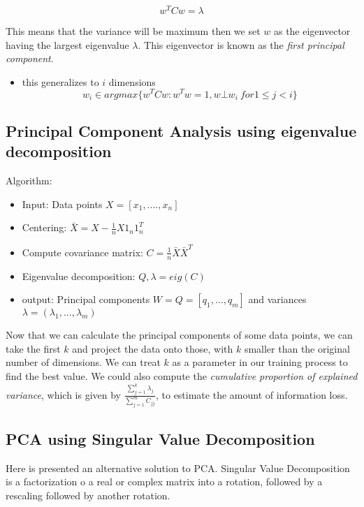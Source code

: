 \documentclass[11pt]{article}
\begin{document}
\[w^TCw=\lambda\]

This means that the variance will be maximum then we set \(w\) as the
eigenvector having the largest eigenvalue \(\lambda\). This eigenvector
is known as the \emph{first principal component}.

\begin{itemize}
\tightlist
\item
  this generalizes to \(i\) dimensions
  \[w_i \in argmax \{ w^T C w: w^T w =1, w \bot w_i\ for 1 \le j < i \}\]
\end{itemize}

\subsection{Principal Component Analysis using eigenvalue
decomposition}\label{principal-component-analysis-using-eigenvalue-decomposition}

Algorithm:

\begin{itemize}
\tightlist
\item
  Input: Data points \(X=[x_1, ...., x_n]\)
\item
  Centering: \(\bar X = X - \frac{1}{n}X1_n1_n^T\)
\item
  Compute covariance matrix: \(C=\frac{1}{n}\bar X \bar X^T\)
\item
  Eigenvalue decomposition: \(Q, \lambda = eig(C)\)
\item
  output: Principal components \(W = Q = [q_1, ..., q_m]\) and variances
  \(\lambda = (\lambda _1, ..., \lambda _m)\)
\end{itemize}

Now that we can calculate the principal components of some data points,
we can take the first \(k\) and project the data onto those, with \(k\)
smaller than the original number of dimensions. We can treat \(k\) as a
parameter in our training process to find the best value. We could also
compute the \emph{cumulative proportion of explained variance}, which is
given by \(\frac{\sum_{j=1}^k \lambda_j}{\sum_{j=1}^m C_{jj}}\), to
estimate the amount of information loss.

\subsection{PCA using Singular Value
Decomposition}\label{pca-using-singular-value-decomposition}

Here is presented an alternative solution to PCA. Singular Value
Decomposition is a factorization o a real or complex matrix into a
rotation, followed by a rescaling followed by another rotation.
\end{document}
